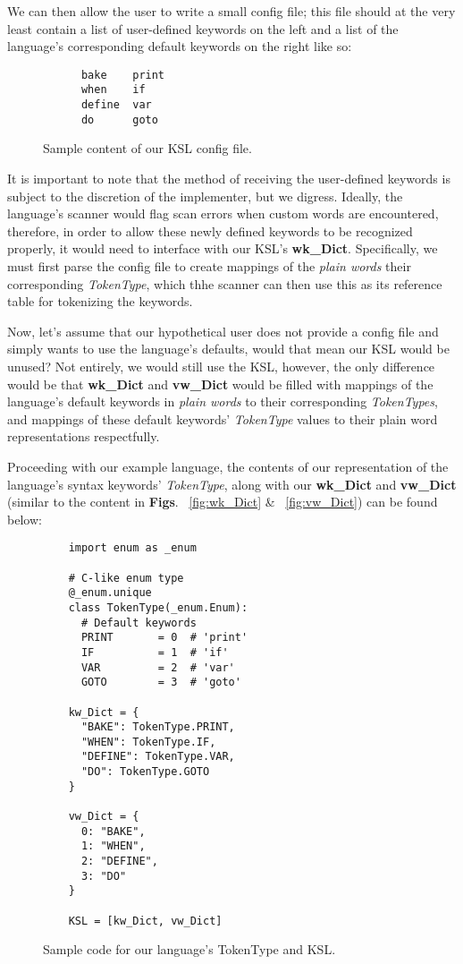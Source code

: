 \documentclass{article}
\begin{document}
We can then allow the user to write a small config file; this file should at the very least contain a list of user-defined keywords on the left and a list of the language's corresponding default keywords on the right like so:

\begin{figure}[ht]
  \begin{verbatim}
      bake    print
      when    if
      define  var
      do      goto
  \end{verbatim}
  \caption{Sample content of our KSL config file.}
  \label{fig:ksl-config-file}
\end{figure}

It is important to note that the method of receiving the user-defined keywords is subject to the discretion of the implementer, but we digress. Ideally, the language's scanner would flag scan errors when custom words are encountered, therefore, in order to allow these newly defined keywords to be recognized properly, it would need to interface with our KSL's \textbf{wk\_Dict}. Specifically, we must first parse the config file to create mappings of the \textit{plain words} their corresponding \textit{TokenType}, which thhe scanner can then use this as its reference table for tokenizing the keywords.

Now, let's assume that our hypothetical user does not provide a config file and simply wants to use the language's defaults, would that mean our KSL would be unused? Not entirely, we would still use the KSL, however, the only difference would be that \textbf{wk\_Dict} and \textbf{vw\_Dict} would be filled with mappings of the language's default keywords in \textit{plain words} to their corresponding \textit{TokenTypes}, and mappings of these default keywords' \textit{TokenType} values to their plain word representations respectfully.

Proceeding with our example language, the contents of our representation of the language's syntax keywords' \textit{TokenType}, along with our \textbf{wk\_Dict} and \textbf{vw\_Dict} (similar to the content in \textbf{Figs}. ~\ref{fig:wk_Dict} \& ~\ref{fig:vw_Dict}) can be found below:

\begin{figure}[ht]
  \begin{verbatim}
    import enum as _enum 

    # C-like enum type
    @_enum.unique
    class TokenType(_enum.Enum):
      # Default keywords
      PRINT       = 0  # 'print'
      IF          = 1  # 'if'
      VAR         = 2  # 'var'
      GOTO        = 3  # 'goto'
    
    kw_Dict = {
      "BAKE": TokenType.PRINT,
      "WHEN": TokenType.IF,
      "DEFINE": TokenType.VAR,
      "DO": TokenType.GOTO
    }

    vw_Dict = {
      0: "BAKE",
      1: "WHEN",
      2: "DEFINE",
      3: "DO"
    }

    KSL = [kw_Dict, vw_Dict]
  \end{verbatim}
  \caption{Sample code for our language's TokenType and KSL.}
  \label{fig:sample-code0}
\end{figure}
\end{document}
